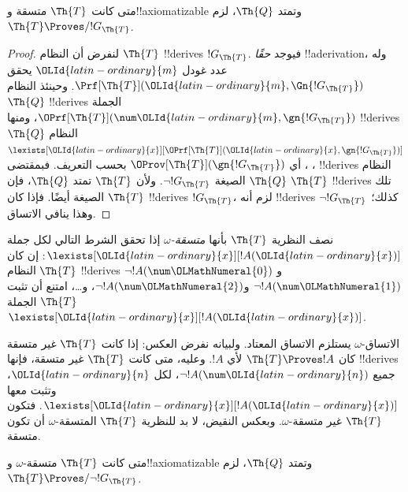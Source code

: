 \documentclass[../../../include/open-logic-section]{subfiles}
\begin{document}
\begin{lem}
متى كانت $\Th{T}$ متسقة و!!{axiomatizable} وتمتد $\Th{Q}$،
لزم $\Th{T}\Proves/ !G_\Th{T}$.
\end{lem}

\begin{proof}
لنفرض أن النظام $\Th{T}$ !!{derive}s $!G_\Th{T}$.
فيوجد \emph{حقًا} !!a{derivation}، وله عدد غودل $\OLId{latin-ordinary}{m}$ يحقق
$\Prf[\Th{T}](\OLId{latin-ordinary}{m},\Gn{!G_\Th{T}})$. وحينئذ النظام $\Th{Q}$
!!{derive}s الجملة $\OPrf[\Th{T}](\num \OLId{latin-ordinary}{m},\gn{!G_\Th{T}})$،
ومنها !!{derive}s النظام $\Th{Q}$
$\lexists[\OLId{latin-ordinary}{x}][\OPrf[\Th{T}](\OLId{latin-ordinary}{x},\gn{!G_\Th{T}})]$،
أي $\OProv[\Th{T}](\gn{!G_\Th{T}})$ بحسب التعريف.
فبمقتضى ، !!{derive}s النظام $\Th{Q}$
الصيغة $\lnot !G_\Th{T}$. ولأن $\Th{T}$ تمتد $\Th{Q}$،
فإن $\Th{T}$ !!{derive}s تلك الصيغة أيضًا.
فإذا كان $\Th{T}$ !!{derive}s $!G_\Th{T}$، لزم أنه !!{derive}s
$\lnot !G_\Th{T}$ كذلك؛ وهذا ينافي الاتساق.
\end{proof}

\begin{defn}
نصف النظرية $\Th{T}$ بأنها \emph{متسقة-$\omega$} إذا تحقق الشرط
التالي لكل جملة $\lexists[\OLId{latin-ordinary}{x}][!A(\OLId{latin-ordinary}{x})]$: إن كان النظام $\Th{T}$
!!{derive}s $\lnot !A(\num \OLMathNumeral{0})$ و$\lnot !A(\num \OLMathNumeral{1})$ و$\lnot !A(\num \OLMathNumeral{2})$،
و\dots، امتنع أن تثبت $\Th{T}$ الجملة $\lexists[\OLId{latin-ordinary}{x}][!A(\OLId{latin-ordinary}{x})]$.
\end{defn}

الاتساق-$\omega$ يستلزم الاتساق المعتاد. ولبيانه نفرض العكس:
إذا كانت $\Th{T}$ غير متسقة كان $\Th{T}\Proves !A$ لأي $!A$.
وعليه، متى كانت $\Th{T}$ غير متسقة، فإنها !!{derive}s جميع
$\lnot !A(\num \OLId{latin-ordinary}{n})$، لكل $\OLId{latin-ordinary}{n}$، وتثبت معها
$\lexists[\OLId{latin-ordinary}{x}][!A(\OLId{latin-ordinary}{x})]$. فتكون $\Th{T}$ غير متسقة-$\omega$.
وبعكس النقيض، لا بد للنظرية $\Th{T}$ المتسقة-$\omega$ أن تكون
متسقة.

\begin{lem}
متى كانت $\Th{T}$ متسقة-$\omega$ و!!{axiomatizable} وتمتد
$\Th{Q}$، لزم $\Th{T}\Proves/\lnot !G_\Th{T}$.
\end{lem}
\end{document}
